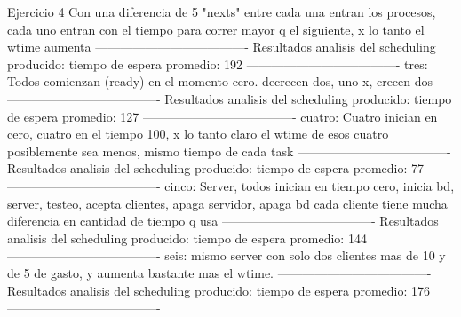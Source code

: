 \begin{section}{Ejercicio 4}
		Con una diferencia de 5 "nexts" entre cada una entran los procesos, cada uno entran con el tiempo para correr mayor q el siguiente, x lo tanto el wtime aumenta
	-------------------------------------
	Resultados analisis del scheduling producido:
	tiempo de espera promedio: 192
	-------------------------------------
tres:
	Todos comienzan (ready) en el momento cero. decrecen dos, uno x, crecen dos
	-------------------------------------
	Resultados analisis del scheduling producido:
	tiempo de espera promedio: 127
	-------------------------------------
cuatro:
	Cuatro inician en cero, cuatro en el tiempo 100, x lo tanto claro el wtime de esos cuatro posiblemente sea menos, mismo tiempo de cada task
	-------------------------------------
	Resultados analisis del scheduling producido:
	tiempo de espera promedio: 77
	-------------------------------------
cinco:
	Server, todos inician en tiempo cero, inicia bd, server, testeo, acepta clientes, apaga servidor, apaga bd
	cada cliente tiene mucha diferencia en cantidad de tiempo q usa
	-------------------------------------
	Resultados analisis del scheduling producido:
	tiempo de espera promedio: 144
	-------------------------------------
seis:
	mismo server con solo dos clientes mas de 10 y de 5 de gasto, y aumenta bastante mas el wtime.
	-------------------------------------
	Resultados analisis del scheduling producido:
	tiempo de espera promedio: 176
	-------------------------------------


\end{section}


